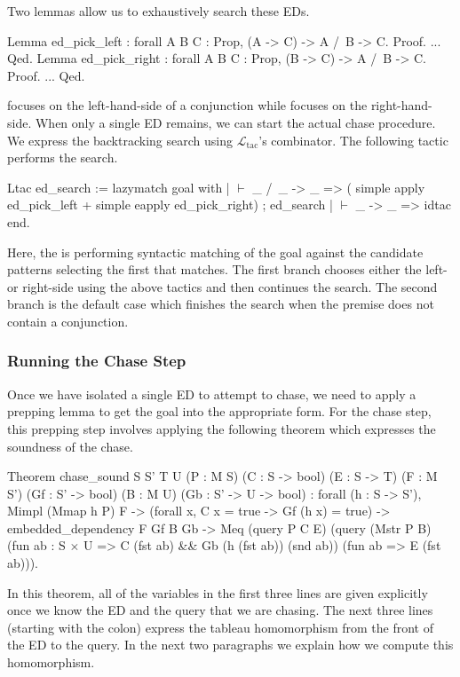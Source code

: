 \documentclass[preprint]{sigplanconf}
\newcommand{\ltac}[0]{\ensuremath{\mathcal{L}_{\mathrm{tac}}}}
\begin{document}
Two lemmas allow us to exhaustively search these EDs.
\begin{coq}
Lemma ed_pick_left : forall {A B C : Prop},
  (A -> C) ->
  A /\ B -> C.
Proof. ... Qed.
Lemma ed_pick_right : forall {A B C : Prop},
  (B -> C) ->
  A /\ B -> C.
Proof. ... Qed.
\end{coq}
 focuses on the left-hand-side of a conjunction while  focuses on the right-hand-side.
When only a single ED remains, we can start the actual chase procedure.
We express the backtracking search using \ltac's \coqe{+} combinator.
The following tactic performs the search.
\begin{coq}
Ltac ed_search :=
  lazymatch goal with
  | $\vdash$ _ /\ _ -> _ =>
    (  simple apply ed_pick_left
     + simple eapply ed_pick_right) ; ed_search
  | $\vdash$ _ -> _ => idtac
  end.
\end{coq}
Here, the  is performing syntactic matching of the goal against the candidate patterns selecting the first that matches.
The first branch chooses either the left- or right-side using the above tactics and then continues the search.
The second branch is the default case which finishes the search when the premise does not contain a conjunction.


\subsubsection{Running the Chase Step}
\label{sec:chase-step}

Once we have isolated a single ED to attempt to chase, we need to apply a prepping lemma to get the goal into the appropriate form.
For the chase step, this prepping step involves applying the following theorem which expresses the soundness of the chase.
\begin{coq}
Theorem chase_sound {S S' T U}
  (P : M S) (C : S -> bool) (E : S -> T)
  (F : M S') (Gf : S' -> bool) (B : M U) (Gb : S' -> U -> bool)
: forall (h : S -> S'),
    Mimpl (Mmap h P) F ->
    (forall x, C x = true -> Gf (h x) = true) ->
    embedded_dependency F Gf B Gb ->
    Meq (query P C E)
        (query (Mstr P B)
               (fun ab : S $\times$ U => C (fst ab) &&
                                  Gb (h (fst ab)) (snd ab))
               (fun ab => E (fst ab))).
\end{coq}
In this theorem, all of the variables in the first three lines are given explicitly once we know the ED and the query that we are chasing.  The next three lines (starting with the colon) express the tableau homomorphism from the front of the ED to the query.
In the next two paragraphs we explain how we compute this homomorphism.
\end{document}
